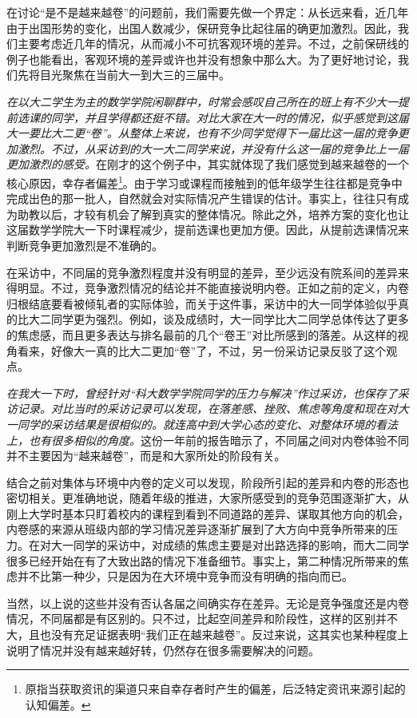 \documentclass[UTF8,a4paper,fontset=windows,11pt,openany]{ctexbook}
\begin{document}
在讨论“是不是越来越卷”的问题前，我们需要先做一个界定：从长远来看，近几年由于出国形势的变化，出国人数减少，保研竞争比起往届的确更加激烈。因此，我们主要考虑近几年的情况，从而减小不可抗客观环境的差异。不过，之前保研线的例子也能看出，客观环境的差异或许也并没有想象中那么大。为了更好地讨论，我们先将目光聚焦在当前大一到大三的三届中。

\emph{在以大二学生为主的数学学院闲聊群中，时常会感叹自己所在的班上有不少大一提前选课的同学，并且学得都还挺不错。对比大家在大一时的情况，似乎感觉到这届大一要比大二更“卷”。从整体上来说，也有不少同学觉得下一届比这一届的竞争更加激烈。不过，从采访到的大一大二同学来说，并没有什么这一届的竞争比上一届更加激烈的感受。}在刚才的这个例子中，其实就体现了我们感觉到越来越卷的一个核心原因，幸存者偏差\footnote{原指当获取资讯的渠道只来自幸存者时产生的偏差，后泛特定资讯来源引起的认知偏差。}。由于学习或课程而接触到的低年级学生往往都是竞争中完成出色的那一批人，自然就会对实际情况产生错误的估计。事实上，往往只有成为助教以后，才较有机会了解到真实的整体情况。除此之外，培养方案的变化也让这届数学学院大一下时课程减少，提前选课也更加方便。因此，从提前选课情况来判断竞争更加激烈是不准确的。

在采访中，不同届的竞争激烈程度并没有明显的差异，至少远没有院系间的差异来得明显。不过，竞争激烈情况的结论并不能直接说明内卷。正如之前的定义，内卷归根结底要看被倾轧者的实际体验，而关于这件事，采访中的大一同学体验似乎真的比大二同学更为强烈。例如，谈及成绩时，大一同学比大二同学总体传达了更多的焦虑感，而且更多表达与排名最前的几个“卷王”对比所感到的落差。从这样的视角看来，好像大一真的比大二更加“卷”了，不过，另一份采访记录反驳了这个观点。

\emph{在我大一下时，曾经针对“科大数学学院同学的压力与解决”作过采访，也保存了采访记录。对比当时的采访记录可以发现，在落差感、挫败、焦虑等角度和现在对大一同学的采访结果是很相似的。就连高中到大学心态的变化、对整体环境的看法上，也有很多相似的角度。}这份一年前的报告暗示了，不同届之间对内卷体验不同并不主要因为“越来越卷”，而是和大家所处的阶段有关。

结合之前对集体与环境中内卷的定义可以发现，阶段所引起的差异和内卷的形态也密切相关。更准确地说，随着年级的推进，大家所感受到的竞争范围逐渐扩大，从刚上大学时基本只盯着校内的课程到看到不同道路的差异、谋取其他方向的机会，内卷感的来源从班级内部的学习情况差异逐渐扩展到了大方向中竞争所带来的压力。在对大一同学的采访中，对成绩的焦虑主要是对出路选择的影响，而大二同学很多已经开始在有了大致出路的情况下准备细节。事实上，第二种情况所带来的焦虑并不比第一种少，只是因为在大环境中竞争而没有明确的指向而已。

当然，以上说的这些并没有否认各届之间确实存在差异。无论是竞争强度还是内卷情况，不同届都是有区别的。只不过，比起空间差异和阶段性，这样的区别并不大，且也没有充足证据表明“我们正在越来越卷”。反过来说，这其实也某种程度上说明了情况并没有越来越好转，仍然存在很多需要解决的问题。
\end{document}
